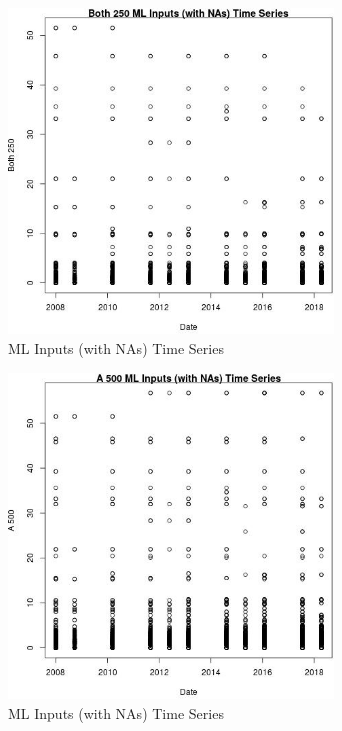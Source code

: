 \begin{figure} 
\centering  
\includegraphics[width=0.77\textwidth]{Code_Outputs/Report_ML_input_PM25_Step4_part_e_de_duplicated_aves_compiled_2019-05-18wNAs_Both_250vDate.jpg} 
\caption{\label{fig:Report_ML_input_PM25_Step4_part_e_de_duplicated_aves_compiled_2019-05-18wNAsBoth_250vDate}ML Inputs (with NAs) Time Series} 
\end{figure} 
 

\begin{figure} 
\centering  
\includegraphics[width=0.77\textwidth]{Code_Outputs/Report_ML_input_PM25_Step4_part_e_de_duplicated_aves_compiled_2019-05-18wNAs_A_500vDate.jpg} 
\caption{\label{fig:Report_ML_input_PM25_Step4_part_e_de_duplicated_aves_compiled_2019-05-18wNAsA_500vDate}ML Inputs (with NAs) Time Series} 
\end{figure} 
 

